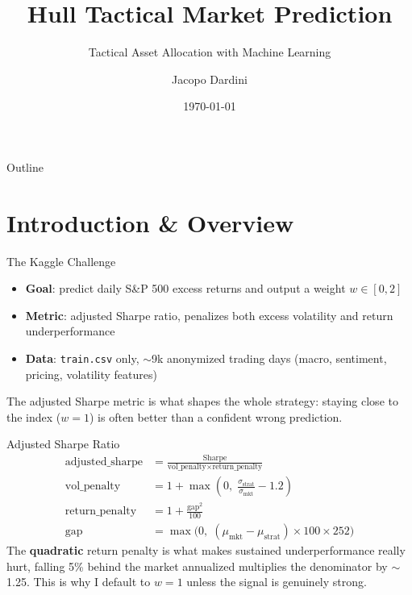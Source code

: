 \documentclass[aspectratio=169]{beamer}
\title{Hull Tactical Market Prediction}
\subtitle{Tactical Asset Allocation with Machine Learning}
\author{Jacopo Dardini}
\date{\today}
\begin{document}
\begin{frame}
\titlepage
\end{frame}

\begin{frame}{Outline}
\tableofcontents
\end{frame}

\section{Introduction \& Overview}

\begin{frame}{The Kaggle Challenge}
\begin{itemize}
    \item \textbf{Goal}: predict daily S\&P 500 excess returns and output a weight $w \in [0, 2]$
    \item \textbf{Metric}: adjusted Sharpe ratio, penalizes both excess volatility and return underperformance
    \item \textbf{Data}: \texttt{train.csv} only, $\sim$9k anonymized trading days (macro, sentiment, pricing, volatility features)
\end{itemize}
\vspace{0.3cm}
The adjusted Sharpe metric is what shapes the whole strategy: staying close to the index ($w = 1$) is often better than a confident wrong prediction.
\end{frame}

\begin{frame}{Adjusted Sharpe Ratio}
\begin{align*}
    \text{adjusted\_sharpe} &= \frac{\text{Sharpe}}{\text{vol\_penalty} \times \text{return\_penalty}} \\[0.1cm]
    \text{vol\_penalty} &= 1 + \max\left(0,\; \frac{\sigma_{\text{strat}}}{\sigma_{\text{mkt}}} - 1.2\right) \\[0.05cm]
    \text{return\_penalty} &= 1 + \frac{\text{gap}^2}{100} \\[0.05cm]
    \text{gap} &= \max\bigl(0,\; (\mu_{\text{mkt}} - \mu_{\text{strat}}) \times 100 \times 252\bigr)
\end{align*}
\vspace{0.1cm}
The \textbf{quadratic} return penalty is what makes sustained underperformance really hurt, falling 5\% behind the market annualized multiplies the denominator by $\sim$1.25. This is why I default to $w = 1$ unless the signal is genuinely strong.
\end{frame}
\end{document}
